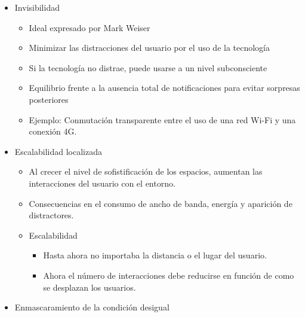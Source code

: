 \begin{itemize}
\begin{itemize}
    \end{itemize}
    \item Invisibilidad
          \begin{itemize}
            \item Ideal expresado por Mark Weiser
            \item Minimizar las distracciones del usuario por el uso de la tecnología
            \item Si la tecnología no distrae, puede usarse a un nivel subconsciente
            \item Equilibrio frente a la ausencia total de notificaciones para evitar sorpresas posteriores
            \item Ejemplo: Conmutación transparente entre el uso de una red Wi-Fi y una conexión 4G.
          \end{itemize} 
    \item{Escalabilidad localizada}
    \begin{itemize}
        \item Al crecer el nivel de sofistificación de los espacios, aumentan las interacciones del usuario con el entorno.
        \item Consecuencias en el consumo de ancho de banda, energía y aparición de distractores.
        \item Escalabilidad
        \begin{itemize}
            \item Hasta ahora no importaba la distancia o el lugar del usuario.
            \item Ahora el número de interacciones debe reducirse en función de como se desplazan los usuarios.
        \end{itemize}
    \end{itemize}
    \item{Enmascaramiento de la condición desigual}
\end{itemize}
    



